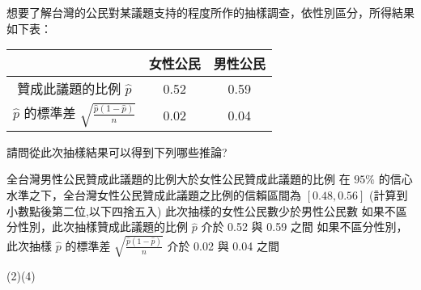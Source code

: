 \begin{QUESTIONS}
\begin{QUESTION}
\begin{ExamAnsRateInfo}{21}{37}{16}{10}
        \end{ExamAnsRateInfo}
        \begin{QBODY}
			想要了解台灣的公民對某議題支持的程度所作的抽樣調查，依性別區分，所得結果如下表：
			\begin{center}
				\begin{tabular}{|c|c|c|}
					\hline
					& 女性公民& 男性公民 \\
					\hline
					贊成此議題的比例 $\hat{p}$ & 0.52 &  0.59 \\\hline
					$\hat{p}$ 的標準差   $\sqrt{\frac{\hat{p}(1-\hat{p})}{n}}$ &  0.02 & 0.04 \\\hline
				\end{tabular}
			\end{center}
			
			請問從此次抽樣結果可以得到下列哪些推論?

			\begin{QOPS} 
				\QOP 全台灣男性公民贊成此議題的比例大於女性公民贊成此議題的比例
				\QOP 在 $95\%$ 的信心水準之下，全台灣女性公民贊成此議題之比例的信賴區間為
			$[0.48,0.56]$ (計算到小數點後第二位,以下四捨五入)
				\QOP 此次抽樣的女性公民數少於男性公民數
				\QOP 如果不區分性別，此次抽樣贊成此議題的比例 $\hat{p}$ 介於 0.52 與 0.59 之間
				\QOP 如果不區分性別，此次抽樣 $\hat{p}$ 的標準差 $\sqrt{\frac{\hat{p}(1-\hat{p})}{n}}$ 介於 0.02 與 0.04 之間
			\end{QOPS}
        \end{QBODY}
        \begin{QFROMS}
        \end{QFROMS}
        \begin{QTAGS}\end{QTAGS}
        \begin{QANS}
            (2)(4)
        \end{QANS}
        \begin{QSOLLIST}
        \end{QSOLLIST}
        \begin{QEMPTYSPACE}
        \end{QEMPTYSPACE}
    \end{QUESTION}
\end{QUESTIONS}
